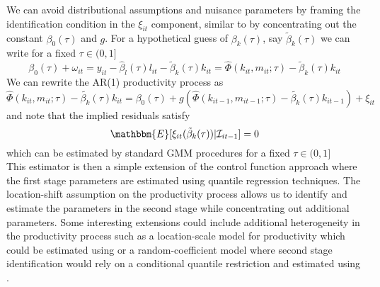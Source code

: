 \documentclass[11pt]{article}
\begin{document}
We can avoid distributional assumptions and nuisance parameters by framing the identification condition in the $\xi_{it}$ component, similar to \cite{Ackerberg2015} by concentrating out the constant $\beta_{0}(\tau)$ and $g$. For a hypothetical guess of $\beta_{k}(\tau)$, say  $\tilde{\beta}_{k}(\tau)$ we can write for a fixed $\tau\in (0,1]$
\begin{equation}
\beta_{0}(\tau)+\omega_{it}=y_{it}-\hat{\beta}_{l}(\tau)l_{it}-\tilde{\beta}_{k}(\tau)k_{it}=\hat{\Phi}(k_{it}, m_{it}; \tau)-\tilde{\beta}_{k}(\tau)k_{it}
\end{equation}
We can rewrite the AR(1) productivity process as
\begin{equation}
\hat{\Phi}(k_{it}, m_{it}; \tau)-\tilde{\beta_{k}}(\tau)k_{it}=\beta_{0}(\tau)+g(\hat{\Phi}(k_{it-1}, m_{it-1}; \tau)-\tilde{\beta_{k}}(\tau)k_{it-1})+\xi_{it}
\end{equation}
and note that the implied residuals satisfy
\begin{equation} \label{2ndxi}
\mathbbm{E}[\xi_{it}(\tilde{\beta}_{k}(\tau))|\mathcal{I}_{it-1}]=0
\end{equation}
which can be estimated by standard GMM procedures for a fixed $\tau\in (0,1]$\\

This estimator is then a simple extension of the control function approach where the first stage parameters are estimated using quantile regression techniques. The location-shift assumption on the productivity process allows us to identify and estimate the parameters in the second stage while concentrating out additional parameters. Some interesting extensions could include additional heterogeneity in the productivity process such as a location-scale model for productivity which could be estimated using \cite{He1997} or a random-coefficient model where second stage identification would rely on a conditional quantile restriction and estimated using \cite{Kaplan2016}.
\end{document}
